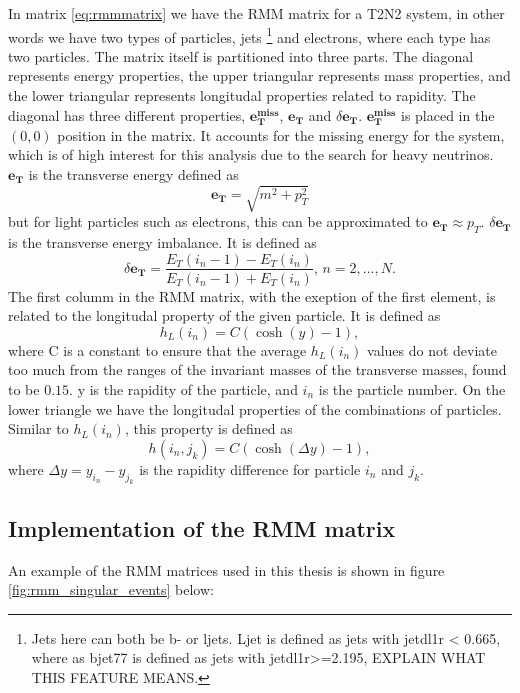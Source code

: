 In matrix \ref{eq:rmmmatrix} we have the RMM matrix for a T2N2 system, in other words we have two types of particles, jets
\footnote{Jets here can both be b- or ljets. Ljet is defined as jets with jetdl1r < 0.665, where as bjet77 is defined as jets with jetdl1r>=2.195, 
EXPLAIN WHAT THIS FEATURE MEANS. } and electrons, where each type has two particles. The matrix itself is partitioned into three parts. 
The diagonal represents energy properties, the upper triangular represents mass properties, and the lower triangular represents longitudal 
properties related to rapidity. The diagonal has three different properties, $\boldsymbol{e_T^{miss}}$, $\boldsymbol{e_T}$ and $\delta\boldsymbol{e_T}$. 
$\boldsymbol{e_T^{miss}}$ is placed in the $(0,0)$ position in the matrix. It accounts for the missing energy for the system, which is of high interest 
for this analysis due to the search for heavy neutrinos. $\boldsymbol{e_T}$ is the transverse energy defined as 
\begin{equation*}
    \boldsymbol{e_T} = \sqrt{m^2 + p_T^2}
\end{equation*}
but for light particles such as electrons, this can be approximated to $\boldsymbol{e_T} \approx p_T$. $\delta\boldsymbol{e_T}$ 
is the transverse energy imbalance. It is defined as 
\begin{equation*}
    \delta\boldsymbol{e_T} = \frac{E_T(i_n-1) - E_T(i_n)}{E_T(i_n-1) + E_T(i_n)}, \, n = 2, ..., N.
\end{equation*}
The first columm in the RMM matrix, with the exeption of the first element, is related to the longitudal property of the given particle. 
It is defined as
\begin{equation*}
    h_L(i_n) = C(\cosh{(y)} - 1),
\end{equation*}
where C is a constant to ensure that the average $h_L(i_n)$ values do not deviate too much from the ranges of the invariant masses 
of the transverse masses, found to be $0.15$\cite{Chekanov_2019}. y is the rapidity of the particle, and $i_n$ is the particle number. 
On the lower triangle we have the longitudal properties of the combinations of particles. Similar to $h_L(i_n)$, this property is defined as 
\begin{equation*}
    h(i_n, j_k) = C(\cosh{(\Delta y)} - 1),
\end{equation*}
where $\Delta y = y_{i_n} - y_{j_k}$ is the rapidity difference for particle $i_n$ and $j_k$. 

\subsection*{Implementation of the RMM matrix}
An example of the RMM matrices used in this thesis is shown in figure \ref{fig:rmm_singular_events} below:



